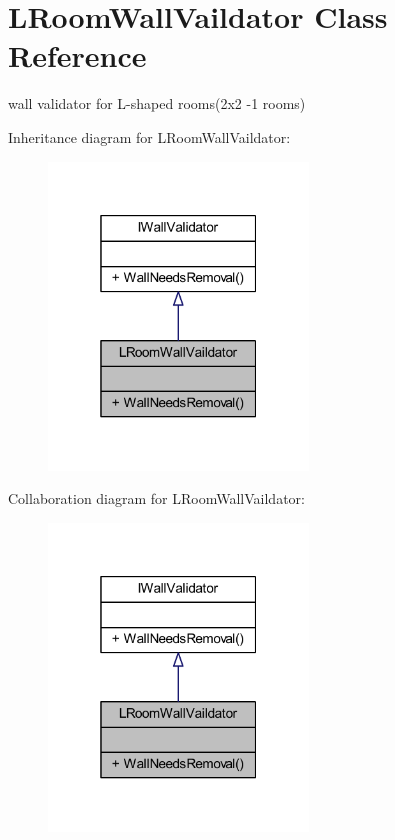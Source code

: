 \hypertarget{class_l_room_wall_vaildator}{}\section{L\+Room\+Wall\+Vaildator Class Reference}
\label{class_l_room_wall_vaildator}


wall validator for L-\/shaped rooms(2x2 -\/1 rooms)  




Inheritance diagram for L\+Room\+Wall\+Vaildator\+:
\nopagebreak
\begin{figure}[H]
\begin{center}
\leavevmode
\includegraphics[width=196pt]{class_l_room_wall_vaildator__inherit__graph}
\end{center}
\end{figure}


Collaboration diagram for L\+Room\+Wall\+Vaildator\+:
\nopagebreak
\begin{figure}[H]
\begin{center}
\leavevmode
\includegraphics[width=196pt]{class_l_room_wall_vaildator__coll__graph}
\end{center}
\end{figure}
